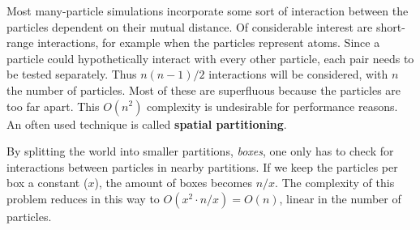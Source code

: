 Most many-particle simulations incorporate some sort of interaction between the 
particles dependent on their mutual distance. Of considerable interest are 
short-range interactions, for example when the particles represent atoms. Since 
a particle could hypothetically interact with every other particle, each pair 
needs to be tested separately. Thus $n(n-1)/2$ interactions will be considered, 
with $n$ the number of particles. Most of these are superfluous because the 
particles are too far apart. This $O(n^2)$ complexity is undesirable for 
performance reasons.  An often used technique is called \textbf{spatial 
partitioning}.

By splitting the world into smaller partitions, \emph{boxes}, one only has to 
check for interactions between particles in nearby partitions. If we keep the 
particles per box a constant ($x$), the amount of boxes becomes $n/x$. The 
complexity of this problem reduces in this way to $O(x^2 \cdot n/x) = O(n)$, 
linear in the number of particles.
